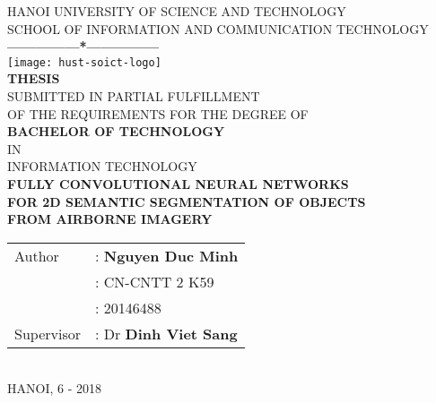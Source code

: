 \begin{spacing}{1.25}
    \thispagestyle{empty}
    \thisfancypage{\setlength{\fboxrule}{1pt}\doublebox}{}
    \begin{center}
        {\fontsize{17}{20}\selectfont HANOI UNIVERSITY OF SCIENCE AND TECHNOLOGY} \\
        {\fontsize{13}{17}\selectfont SCHOOL OF INFORMATION AND COMMUNICATION
        TECHNOLOGY} \\ [0.25cm]
        \textbf{---------------*---------------} \\ [1cm]
        \texttt{[image: hust-soict-logo]} \\ [1cm]
        {\fontsize{25}{30}\selectfont \textbf{THESIS}} \\ [0.25cm]
        {\fontsize{14}{17}\selectfont SUBMITTED IN PARTIAL FULFILLMENT \\
        OF THE REQUIREMENTS FOR THE DEGREE OF} \\ [0.5cm]
        {\fontsize{25}{30}\selectfont \textbf{BACHELOR OF TECHNOLOGY}} \\ [0.5cm]
        {\fontsize{14}{17}\selectfont IN} \\ [0.5cm]
        {\fontsize{22}{26}\selectfont INFORMATION TECHNOLOGY} \\ [0.5cm]
        {\fontsize{15}{15}\selectfont \textbf{FULLY CONVOLUTIONAL NEURAL NETWORKS
        \\FOR 2D SEMANTIC SEGMENTATION OF OBJECTS\\ FROM AIRBORNE IMAGERY}}
        \\ [2.25cm]
        \begin{tabular}{ l l }
            Author & : \textbf{Nguyen Duc Minh} \\
            & : CN-CNTT 2 K59 \\
            & : 20146488 \\ [0.5cm]
            Supervisor & : Dr \textbf{Dinh Viet Sang}
        \end{tabular} \\ [2.25cm]
        {\fontsize{17}{20}\selectfont HANOI, 6 - 2018}
    \end{center}
\end{spacing}
